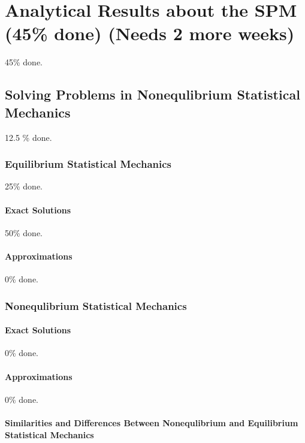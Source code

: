\chapter{Analytical Results about the SPM (45\% done) (Needs 2 more weeks)}

45\% done.

\section{Solving Problems in Nonequlibrium Statistical Mechanics}

12.5 \% done.

\subsection{Equilibrium Statistical Mechanics}

25\% done.

\subsubsection{Exact Solutions}

50\% done.


\subsubsection{Approximations}

0\% done.

\subsection{Nonequlibrium Statistical Mechanics}

\subsubsection{Exact Solutions}

0\% done.
\subsubsection{Approximations}

0\% done.

\subsubsection{Similarities and Differences Between Nonequlibrium and Equilibrium Statistical Mechanics}


